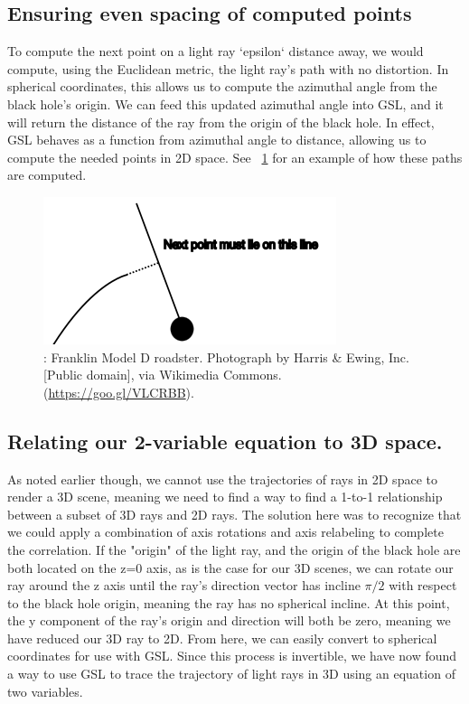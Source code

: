\subsection {Ensuring even spacing of computed points}
To compute the next point on a light ray `epsilon` distance away, we would compute, using the Euclidean metric, the light ray's path with no distortion. In spherical coordinates, this allows us to compute the azimuthal angle from the black hole's origin. We can feed this updated azimuthal angle into GSL, and it will return the distance of the ray from the origin of the black hole. In effect, GSL behaves as a function from azimuthal angle to distance, allowing us to compute the needed points in 2D space. See ~\ref{fig:one} for an example of how these paths are computed.   
\begin{figure}[h]
  \centering
  \includegraphics[width=.65\linewidth]{nextpoint}
  \caption{: Franklin Model D roadster. Photograph by Harris \&
    Ewing, Inc. [Public domain], via Wikimedia Commons. (\url{https://goo.gl/VLCRBB}).
	}
  \label{fig:one}
\end{figure}


\subsection {Relating our 2-variable equation to 3D space.}
As noted earlier though, we cannot use the trajectories of rays in 2D space to render a 3D scene, meaning we need to find a way to find a 1-to-1 relationship between a subset of 3D rays and 2D rays. The solution here was to recognize that we could apply a combination of axis rotations and axis relabeling to complete the correlation. If the "origin" of the light ray, and the origin of the black hole are both located on the z=0 axis, as is the case for our 3D scenes, we can rotate our ray around the z axis until the ray's direction vector has incline $ \pi / 2 $ with respect to the black hole origin, meaning the ray has no spherical incline. At this point, the y component of the ray's origin and direction will both be zero, meaning we have reduced our 3D ray to 2D. From here, we can easily convert to spherical coordinates for use with GSL. Since this process is invertible, we have now found a way to use GSL to trace the trajectory of light rays in 3D using an equation of two variables.


